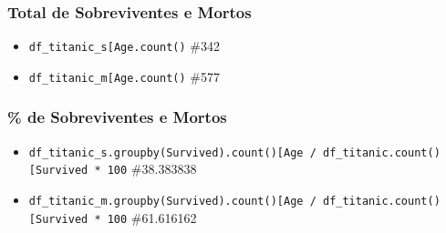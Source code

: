 \documentclass[11pt]{article}
\providecommand{\tightlist}{%
      \setlength{\itemsep}{0pt}\setlength{\parskip}{0pt}}
\begin{document}
    \subsubsection{Total de Sobreviventes e
Mortos}\label{total-de-sobreviventes-e-mortos}

\begin{itemize}
\tightlist
\item
  \texttt{df\_titanic\_s{[}\textquotesingle{}Age\textquotesingle{}{]}.count()}
  \#342
\item
  \texttt{df\_titanic\_m{[}\textquotesingle{}Age\textquotesingle{}{]}.count()}
  \#577
\end{itemize}

\subsubsection{\% de Sobreviventes e
Mortos}\label{de-sobreviventes-e-mortos}

\begin{itemize}
\tightlist
\item
  \texttt{df\_titanic\_s.groupby(\textquotesingle{}Survived\textquotesingle{}).count(){[}\textquotesingle{}Age\textquotesingle{}{]}\ /\ df\_titanic.count(){[}\textquotesingle{}Survived\textquotesingle{}{]}\ *\ 100}
  \#38.383838
\item
  \texttt{df\_titanic\_m.groupby(\textquotesingle{}Survived\textquotesingle{}).count(){[}\textquotesingle{}Age\textquotesingle{}{]}\ /\ df\_titanic.count(){[}\textquotesingle{}Survived\textquotesingle{}{]}\ *\ 100}
  \#61.616162
\end{itemize}
\end{document}
